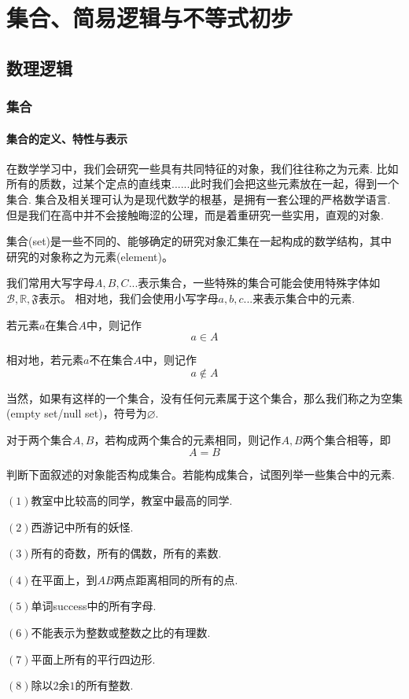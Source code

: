 \part{集合、简易逻辑与不等式初步}
\chapter{数理逻辑}
\section{集合}
\subsection{集合的定义、特性与表示}
在数学学习中，我们会研究一些具有共同特征的对象，我们往往称之为元素.
比如所有的质数，过某个定点的直线束......此时我们会把这些元素放在一起，得到一个集合.
集合及相关理可认为是现代数学的根基，是拥有一套公理的严格数学语言.
但是我们在高中并不会接触晦涩的公理，而是着重研究一些实用，直观的对象.
\begin{definition}
    集合(set)是一些不同的、能够确定的研究对象汇集在一起构成的数学结构，其中研究的对象称之为元素(element)。
\end{definition}

我们常用大写字母$A,B,C...$表示集合，一些特殊的集合可能会使用特殊字体如$\mathcal{B},\mathbb{R},\mathfrak{F} $表示。
相对地，我们会使用小写字母$a,b,c...$来表示集合中的元素.

若元素$a$在集合$A$中，则记作\[a \in A\]

相对地，若元素$a$不在集合$A$中，则记作\[a \notin A\]

当然，如果有这样的一个集合，没有任何元素属于这个集合，那么我们称之为空集(empty set/null set)，符号为$\varnothing $.

对于两个集合$A,B$，若构成两个集合的元素相同，则记作$A,B$两个集合相等，即\[A=B\]
\begin{example}
    判断下面叙述的对象能否构成集合。若能构成集合，试图列举一些集合中的元素.
    
    $(1)$教室中比较高的同学，教室中最高的同学.

    $(2)$西游记中所有的妖怪.

    $(3)$所有的奇数，所有的偶数，所有的素数.

    $(4)$在平面上，到$A$$B$两点距离相同的所有的点.

    $(5)$单词success中的所有字母.

    $(6)$不能表示为整数或整数之比的有理数.

    $(7)$平面上所有的平行四边形.

    $(8)$除以$2$余$1$的所有整数.
\end{example}

